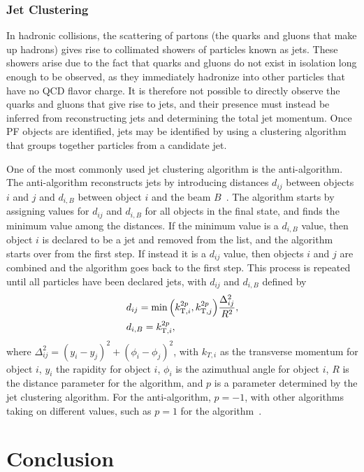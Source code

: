 \subsubsection{Jet Clustering}

In hadronic collisions, the scattering of partons (the quarks and gluons that make up hadrons) gives rise to collimated showers of particles known as jets.
These showers arise due to the fact that quarks and gluons do not exist in isolation long enough to be observed, as they immediately hadronize into other particles that have no QCD flavor charge.
It is therefore not possible to directly observe the quarks and gluons that give rise to jets, and their presence must instead be inferred from reconstructing jets and determining the total jet momentum.
Once PF objects are identified, jets may be identified by using a clustering algorithm that groups together particles from a candidate jet.

One of the most commonly used jet clustering algorithm is the anti-\kt algorithm.
The anti-\kt algorithm reconstructs jets by introducing distances $d_{ij}$ between objects $i$ and $j$ and $d_{i,B}$ between object $i$ and the beam $B$~\cite{Cacciari_2008}.
The algorithm starts by assigning values for $d_{ij}$ and $d_{i,B}$ for all objects in the final state, and finds the minimum value among the distances.
If the minimum value is a $d_{i,B}$ value, then object $i$ is declared to be a jet and removed from the list, and the algorithm starts over from the first step.
If instead it is a $d_{ij}$ value, then objects $i$ and $j$ are combined and the algorithm goes back to the first step.
This process is repeated until all particles have been declared jets, with $d_{ij}$ and $d_{i,B}$ defined by
\begin{align}
  & d_{ij}=\min\pqty{k_{\mathrm{T},i}^{2p},k_{\mathrm{T},j}^{2p}}\frac{\Delta_{ij}^2}{R^2},\\
  & d_{i,B}=k_{\mathrm{T},i}^{2p},
\end{align}
where $\Delta_{ij}^2=(y_i-y_j)^2+(\phi_i-\phi_j)^2$, with $k_{T,i}$ as the transverse momentum for object $i$, $y_i$ the rapidity for object $i$, $\phi_i$ is the azimuthual angle for object $i$, $R$ is the distance parameter for the algorithm, and $p$ is a parameter determined by the jet clustering algorithm.
For the anti-\kt algorithm, $p=-1$, with other algorithms taking on different values, such as $p=1$ for the \kt algorithm~\cite{Marzani_2019}.

\section{Conclusion}

